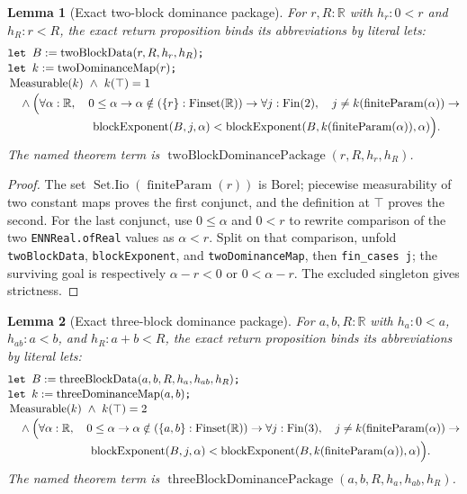\documentclass[9pt]{extarticle}
\newtheorem{lemma}{Lemma}[section]
\theoremstyle{definition}
\theoremstyle{remark}
\newcommand{\R}{\mathbb R}
\begin{document}
\begin{lemma}[Exact two-block dominance package]
\label{lem:two-block-dominance-package}
For $r,R:\R$ with $h_r:0<r$ and $h_R:r<R$, the exact return proposition
binds its abbreviations by literal lets:
\begin{align*}
&\texttt{let }B:=\operatorname{twoBlockData}(r,R,h_r,h_R)\texttt{; }\\[-2pt]
&\texttt{let }k:=\operatorname{twoDominanceMap}(r)\texttt{; }\\[-2pt]
&\operatorname{Measurable}(k)\ \wedge\ k(\top)=1\\[-2pt]
&\quad\wedge\Bigl(\forall\alpha:\R,\quad
 0\leq\alpha\to
 \alpha\notin(\{r\}:\operatorname{Finset}(\R))\to
 \forall j:\operatorname{Fin}(2),\quad
 j\neq k(\operatorname{finiteParam}(\alpha))\to\\[-2pt]
&\hspace{25mm}
 \operatorname{blockExponent}(B,j,\alpha)
 <\operatorname{blockExponent}
   (B,k(\operatorname{finiteParam}(\alpha)),\alpha)\Bigr).
\end{align*}
The named theorem term is
$\operatorname{twoBlockDominancePackage}(r,R,h_r,h_R)$.
\end{lemma}

\begin{proof}
The set $\operatorname{Set.Iio}(\operatorname{finiteParam}(r))$ is Borel;
piecewise measurability of two constant maps proves the first conjunct, and
the definition at $\top$ proves the second.  For the last conjunct, use
$0\leq\alpha$ and $0<r$ to rewrite comparison of the two
\texttt{ENNReal.ofReal} values as $\alpha<r$.  Split on that comparison,
unfold \texttt{twoBlockData}, \texttt{blockExponent}, and
\texttt{twoDominanceMap}, then \texttt{fin\_cases j}; the surviving goal is
respectively $\alpha-r<0$ or $0<\alpha-r$.  The excluded singleton gives
strictness.
\end{proof}

\begin{lemma}[Exact three-block dominance package]
\label{lem:three-block-dominance-package}
For $a,b,R:\R$ with $h_a:0<a$, $h_{ab}:a<b$, and $h_R:a+b<R$, the exact
return proposition binds its abbreviations by literal lets:
\begin{align*}
&\texttt{let }B:=\operatorname{threeBlockData}(a,b,R,h_a,h_{ab},h_R)
 \texttt{; }\\[-2pt]
&\texttt{let }k:=\operatorname{threeDominanceMap}(a,b)\texttt{; }\\[-2pt]
&\operatorname{Measurable}(k)\ \wedge\ k(\top)=2\\[-2pt]
&\quad\wedge\Bigl(\forall\alpha:\R,\quad
 0\leq\alpha\to
 \alpha\notin(\{a,b\}:\operatorname{Finset}(\R))\to
 \forall j:\operatorname{Fin}(3),\quad
 j\neq k(\operatorname{finiteParam}(\alpha))\to\\[-2pt]
&\hspace{25mm}
 \operatorname{blockExponent}(B,j,\alpha)
 <\operatorname{blockExponent}
   (B,k(\operatorname{finiteParam}(\alpha)),\alpha)\Bigr).
\end{align*}
The named theorem term is
$\operatorname{threeBlockDominancePackage}(a,b,R,h_a,h_{ab},h_R)$.
\end{lemma}
\end{document}
